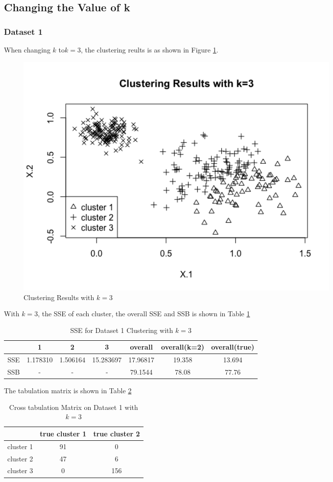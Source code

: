 \documentclass{article}
\begin{document}
	\subsection{Changing the Value of k}
		\subsubsection{Dataset 1}
		When changing $k$ to$k=3$, the clustering reults is as shown in Figure \ref{fig:easy-3-cluster}.

		\begin{figure}[H]
		\centering
		\includegraphics[width = 0.8\textwidth]{easy-3-cluster.png}
		\caption{Clustering Results with $k=3$}
		\label{fig:easy-3-cluster}
		\end{figure}

		With $k = 3$, the SSE of each cluster, the overall SSE and SSB is shown in Table \ref{tbl:sse-easy-3}

		\begin{table}[H]
		\centering
			\begin{tabular}{|c|c|c|c|c|c|c|}
			\hline
			& 1 & 2& 3& overall & overall(k=2)& overall(true) \\
			\hline
			\hline
			SSE & 1.178310  & 1.506164 & 15.283697 & 17.96817 & 19.358 & 13.694\\
			\hline
			SSB & - & - & - & 79.1544 & 78.08 & 77.76 \\
			\hline
			\end{tabular}
			\caption{SSE for Dataset 1 Clustering with $k=3$}
			\label{tbl:sse-easy-3}
		\end{table}

		The tabulation matrix is shown in Table \ref{tbl:cross-easy-3}

		\begin{table}[H]
		\centering
			\begin{tabular}{|c|c|c|}
			\hline
			& true cluster 1 & true cluster 2 \\
			\hline
			cluster 1 & 91 &  0 \\
			\hline
            cluster 2 & 47 &  6 \\
            \hline
            cluster 3 &  0 &156 \\
			 \hline
			\end{tabular}
			\caption{Cross tabulation Matrix on Dataset 1 with $k=3$}
			\label{tbl:cross-easy-3}
		\end{table}
\end{document}
